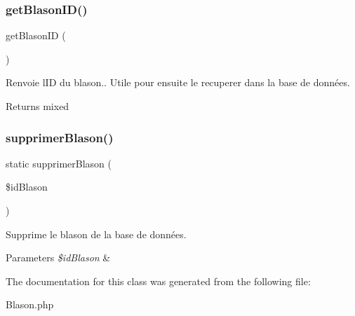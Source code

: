 \subsubsection{\texorpdfstring{get\+Blason\+I\+D()}{getBlasonID()}}
{\footnotesize\ttfamily get\+Blason\+ID (\begin{DoxyParamCaption}{ }\end{DoxyParamCaption})}

Renvoie l\textquotesingle{}ID du blason.. Utile pour ensuite le recuperer dans la base de données. \begin{DoxyReturn}{Returns}
mixed 
\end{DoxyReturn}
\mbox{\label{class_blason_a9c1e328f5f4101eeb999f9b664a8cdcf}} 
\subsubsection{\texorpdfstring{supprimer\+Blason()}{supprimerBlason()}}
{\footnotesize\ttfamily static supprimer\+Blason (\begin{DoxyParamCaption}\item[{}]{\$id\+Blason }\end{DoxyParamCaption})\hspace{0.3cm}{\ttfamily [static]}}

Supprime le blason de la base de données. 
\begin{DoxyParams}{Parameters}
{\em \$id\+Blason} & \\
\hline
\end{DoxyParams}


The documentation for this class was generated from the following file\+:\begin{DoxyCompactItemize}
\item 
Blason.\+php\end{DoxyCompactItemize}
